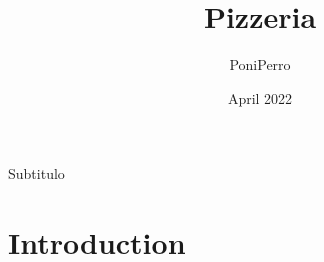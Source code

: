 \documentclass{article}
\title{Pizzeria}
\author{PoniPerro}
\date{April 2022}
\begin{document}
\maketitle

Subtitulo

\section{Introduction}
\end{document}
